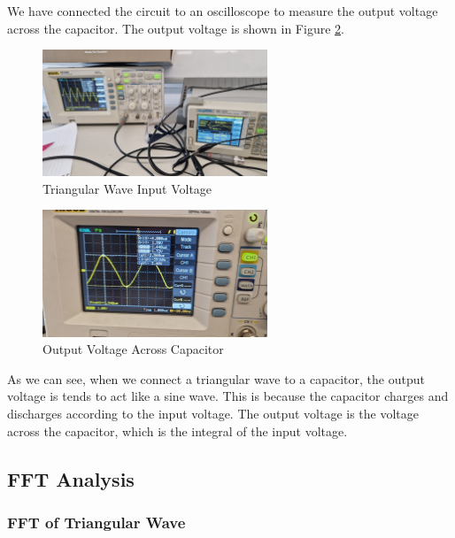 We have connected the circuit to an oscilloscope to measure the output voltage across the capacitor. The output voltage is shown in Figure \ref{fig:triangular-output}.

\begin{figure}[h]
    \centering
    \includegraphics[width=0.6\textwidth]{assets/WhatsApp Image 2024-04-16 at 18.20.11 (3).jpeg}
    \caption{Triangular Wave Input Voltage}
    \label{fig:triangular-input}
\end{figure}


\begin{figure}[h]
    \centering
    \includegraphics[width=0.6\textwidth]{assets/WhatsApp Image 2024-04-16 at 18.20.11 (1).jpeg}
    \caption{Output Voltage Across Capacitor}
    \label{fig:triangular-output}
\end{figure}

As we can see, when we connect a triangular wave to a capacitor, the output voltage is tends to act like a sine wave. This is because the capacitor charges and discharges according to the input voltage. The output voltage is the voltage across the capacitor, which is the integral of the input voltage.

\newpage
\thispagestyle{plain}

\subsection{FFT Analysis}

\subsubsection{FFT of Triangular Wave}

